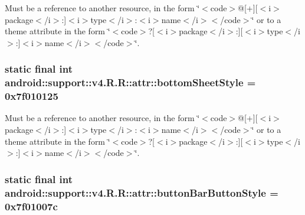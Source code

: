 Must be a reference to another resource, in the form \char`\"{}$<$code$>$@\mbox{[}+\mbox{]}\mbox{[}$<$i$>$package$<$/i$>$:\mbox{]}$<$i$>$type$<$/i$>$:$<$i$>$name$<$/i$>$$<$/code$>$\char`\"{} or to a theme attribute in the form \char`\"{}$<$code$>$?\mbox{[}$<$i$>$package$<$/i$>$:\mbox{]}\mbox{[}$<$i$>$type$<$/i$>$:\mbox{]}$<$i$>$name$<$/i$>$$<$/code$>$\char`\"{}. \hypertarget{classandroid_1_1support_1_1v4_1_1_r_1_1attr_aa2356a76198f3735f538e9e0f541812}{
\subsubsection[{bottomSheetStyle}]{\setlength{\rightskip}{0pt plus 5cm}static final int android::support::v4.R.R::attr::bottomSheetStyle = 0x7f010125}}
\label{classandroid_1_1support_1_1v4_1_1_r_1_1attr_aa2356a76198f3735f538e9e0f541812}


Must be a reference to another resource, in the form \char`\"{}$<$code$>$@\mbox{[}+\mbox{]}\mbox{[}$<$i$>$package$<$/i$>$:\mbox{]}$<$i$>$type$<$/i$>$:$<$i$>$name$<$/i$>$$<$/code$>$\char`\"{} or to a theme attribute in the form \char`\"{}$<$code$>$?\mbox{[}$<$i$>$package$<$/i$>$:\mbox{]}\mbox{[}$<$i$>$type$<$/i$>$:\mbox{]}$<$i$>$name$<$/i$>$$<$/code$>$\char`\"{}. \hypertarget{classandroid_1_1support_1_1v4_1_1_r_1_1attr_a9fd2c551e9547c46944788729311b1f}{
\subsubsection[{buttonBarButtonStyle}]{\setlength{\rightskip}{0pt plus 5cm}static final int android::support::v4.R.R::attr::buttonBarButtonStyle = 0x7f01007c}}
\label{classandroid_1_1support_1_1v4_1_1_r_1_1attr_a9fd2c551e9547c46944788729311b1f}


